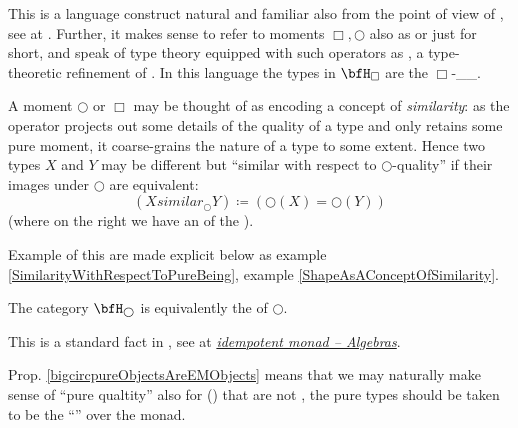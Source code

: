 \begin{remark}
\label{}\hypertarget{}{}
This is a language construct natural and familiar also from the point of view of , see at .
Further, it makes sense to refer to moments $\Box,\bigcirc$ also as  or just  for short, and speak of type theory equipped with such operators as , a type-theoretic refinement of . In this language the types in $\bfH_{\Box}$ are the $\Box$-\_\_.
\end{remark}
\begin{remark}
\label{MomentsAndSimilarity}\hypertarget{MomentsAndSimilarity}{}
A moment $\bigcirc$ or $\Box$ may be thought of as encoding a concept of \emph{similarity}: as the operator projects out some details of the quality of a type and only retains some pure moment, it coarse-grains the nature of a type to some extent. Hence two types $X$ and $Y$ may be different but ``similar with respect to $\bigcirc$-quality'' if their images under $\bigcirc$ are equivalent:
\begin{displaymath}
(X similar_{\bigcirc} Y)
\coloneqq
(\bigcirc(X) =  \bigcirc(Y))
\end{displaymath}
(where on the right we have an  of the ).
\end{remark}
Example of this are made explicit below as example \ref{SimilarityWithRespectToPureBeing}, example \ref{ShapeAsAConceptOfSimilarity}.
\begin{prop}
\label{bigcircpureObjectsAreEMObjects}\hypertarget{bigcircpureObjectsAreEMObjects}{}
The category $\bfH_{\bigcirc}$ is equivalently the  of $\bigcirc$.
\end{prop}
This is a standard fact in , see at \emph{\href{idempotent+monad#AlgebrasForAnIdempotentMonad}{idempotent monad -- Algebras}}.
\begin{remark}
\label{PurityForNonIdempotent}\hypertarget{PurityForNonIdempotent}{}
Prop. \ref{bigcircpureObjectsAreEMObjects} means that we may naturally make sense of ``pure qualtity'' also for () that are not , the pure types should be taken to be the ``'' over the monad.
\end{remark}
